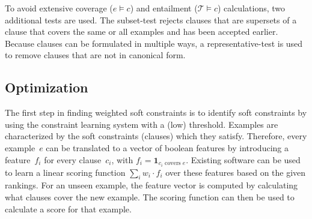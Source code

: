 \documentclass[letterpaper]{article}
\newcommand{\sym}[1]{\ensuremath{\mathcal{#1}}}
\theoremstyle{definition}
\begin{document}
To avoid extensive coverage ($e \models c$) and entailment ($\sym{T} \models c$) calculations, two additional tests are used.
The subset-test rejects clauses that are supersets of a clause that covers the same or all examples and has been accepted earlier.
Because clauses can be formulated in multiple ways, a representative-test is used to remove clauses that are not in canonical form.


\subsection{Optimization}
The first step in finding weighted soft constraints is to identify soft constraints by using the constraint learning system with a (low) threshold.
Examples are characterized by the soft constraints (clauses) which they satisfy.
Therefore, every example~$e$ can be translated to a vector of boolean features by introducing a feature~$f_i$ for every clause~$c_i$, with $f_i = \mathbf{1}_{c_i \text{ covers } e}$. 
Existing software can be used to learn a linear scoring function $\sum_i w_i \cdot f_i$ over these features based on the given rankings.
For an unseen example, the feature vector is computed by calculating what clauses cover the new example.
The scoring function can then be used to calculate a score for that example.
\end{document}
